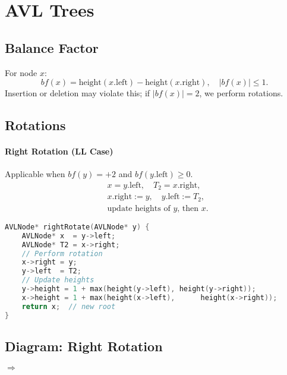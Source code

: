 \documentclass[12pt]{article}
\begin{document}
\newpage
\section{AVL Trees}
\subsection*{Balance Factor}
For node \(x\):
\[
  \mathit{bf}(x) = \text{height}(x.\mathrm{left}) - \text{height}(x.\mathrm{right}),\quad
  |\mathit{bf}(x)| \le 1.
\]
Insertion or deletion may violate this; if \(|\mathit{bf}(x)| = 2\), we perform rotations.

\subsection*{Rotations}
\paragraph{Right Rotation (LL Case)}
Applicable when \(\mathit{bf}(y)=+2\) and \(\mathit{bf}(y.\mathrm{left})\ge0\).
\[
  \begin{aligned}
    &x = y.\mathrm{left},\quad T_2 = x.\mathrm{right},\\
    &x.\mathrm{right} := y,\quad y.\mathrm{left} := T_2,\\
    &\text{update heights of \(y\), then \(x\)}.
  \end{aligned}
\]
\begin{lstlisting}[language=C]
AVLNode* rightRotate(AVLNode* y) {
    AVLNode* x  = y->left;
    AVLNode* T2 = x->right;
    // Perform rotation
    x->right = y;
    y->left  = T2;
    // Update heights
    y->height = 1 + max(height(y->left), height(y->right));
    x->height = 1 + max(height(x->left),      height(x->right));
    return x;  // new root
}
\end{lstlisting}

\subsection*{Diagram: Right Rotation}
\begin{center}
\quad$\Longrightarrow$\quad
{}
\end{center}
\end{document}
